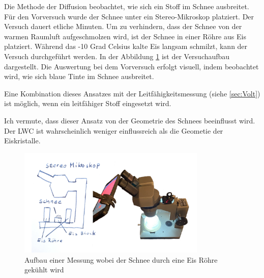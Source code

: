 Die Methode der Diffusion beobachtet, wie sich ein Stoff im Schnee ausbreitet. Für den Vorversuch wurde der Schnee unter ein Stereo-Mikroskop platziert. Der Versuch dauert etliche Minuten. Um zu verhindern, dass der Schnee von der warmen Raumluft aufgeschmolzen wird, ist der Schnee in einer Röhre aus Eis platziert. Während das -10 Grad Celsius kalte Eis langsam schmilzt, kann der Versuch durchgeführt werden. In der Abbildung \ref{fig:DiffMess} ist der Versuchaufbau dargestellt. Die Auswertung bei dem Vorversuch erfolgt visuell, indem beobachtet wird, wie sich blaue Tinte im Schnee ausbreitet.

Eine Kombination dieses Ansatzes mit der Leitfähigkeitsmessung (siehe \ref{sec:Volt}) ist möglich, wenn ein leitfähiger Stoff eingesetzt wird.

Ich vermute, dass dieser Ansatz von der Geometrie des Schnees beeinflusst wird. Der LWC ist wahrscheinlich weniger einflussreich als die Geometie der Eiskristalle.

\begin{figure}[H]
    \centering
    \includegraphics[width=0.8\textwidth]{Bilder/freistellen.jpeg}
    \caption{Aufbau einer Messung wobei der Schnee durch eine Eis Röhre gekühlt wird}
    \label{fig:DiffMess}
\end{figure}
